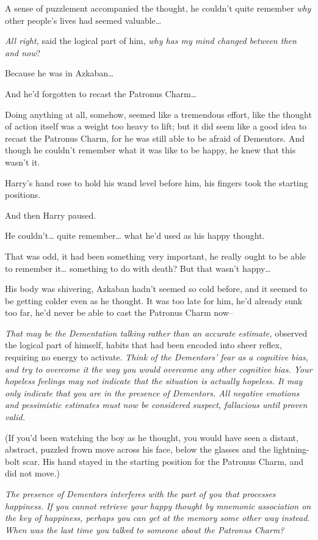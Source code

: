 A sense of puzzlement accompanied the thought, he couldn't quite remember \emph{why} other people's lives had seemed valuable{\ldots}

\emph{All right,} said the logical part of him, \emph{why has my mind changed between then and now}?

Because he was in Azkaban{\ldots}

And he'd forgotten to recast the Patronus Charm{\ldots}

Doing anything at all, somehow, seemed like a tremendous effort, like the thought of action itself was a weight too heavy to lift; but it did seem like a good idea to recast the Patronus Charm, for he was still able to be afraid of Dementors. And though he couldn't remember what it was like to be happy, he knew that this wasn't it.

Harry's hand rose to hold his wand level before him, his fingers took the starting positions.

And then Harry paused.

He couldn't{\ldots} quite remember{\ldots} what he'd used as his happy thought.

That was odd, it had been something very important, he really ought to be able to remember it{\ldots} something to do with death? But that wasn't happy{\ldots}

His body was shivering, Azkaban hadn't seemed so cold before, and it seemed to be getting colder even as he thought. It was too late for him, he'd already sunk too far, he'd never be able to cast the Patronus Charm now\---

\emph{That may be the Dementation talking rather than an accurate estimate,} observed the logical part of himself, habits that had been encoded into sheer reflex, requiring no energy to activate. \emph{Think of the Dementors' fear as a cognitive bias, and try to overcome it the way you would overcome any other cognitive bias. Your hopeless feelings may not indicate that the situation is actually hopeless. It may only indicate that you are in the presence of Dementors. All negative emotions and pessimistic estimates must now be considered suspect, fallacious until proven valid.}

(If you'd been watching the boy as he thought, you would have seen a distant, abstract, puzzled frown move across his face, below the glasses and the lightning-bolt scar. His hand stayed in the starting position for the Patronus Charm, and did not move.)

\emph{The presence of Dementors interferes with the part of you that processes happiness. If you cannot retrieve your happy thought by mnemonic association on the key of happiness, perhaps you can get at the memory some other way instead. When was the last time you talked to someone about the Patronus Charm?}

